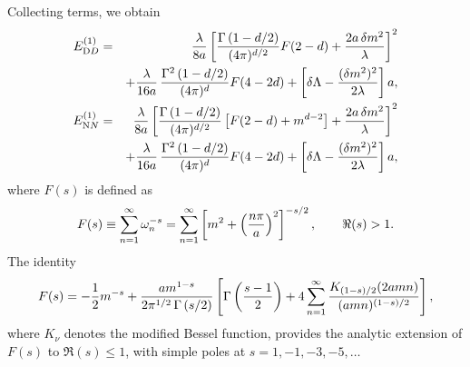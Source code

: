 \documentclass[a4paper,dvips,12pt]{article}
\begin{document}
Collecting terms, we obtain
\begin {eqnarray}
E_{\textrm DD}^{(1)}&=&{\lambda\over 8a}\left[{\Gamma\left(1-d/2\right)\over(4\pi)^{d/2}}
F(2-d)+{2a\,\delta m^{2}\over\lambda}\right]^{2}
\nonumber \\
& &+{\lambda\over 16a}\,{\Gamma^{2}\left(1-d/2\right)\over(4\pi)^{d}}
F(4-2d)+\left[{\delta\Lambda}-{(\delta m^{2})^{2}\over 2\lambda}\right]a,
\label{E2passo}
\\
E_{\textrm NN}^{(1)}&=&{\lambda\over 8a}\left[{\Gamma\left(1-d/2\right)\over(4\pi)^{d/2}}
\left[F(2-d)+m^{d-2}\right]+{2a\,\delta m^{2}\over\lambda}\right]^{2}
\nonumber \\
& &+{\lambda\over 16a}\,{\Gamma^{2}\left(1-d/2\right)\over(4\pi)^{d}}
F(4-2d)+\left[\delta\Lambda-{(\delta m^{2})^{2}\over 2\lambda}\right]a,
\label{E3passo}
\end {eqnarray}
where $F(s)$ is defined as
%
\begin {equation}
F(s)\equiv\sum_{n=1}^{\infty}\omega_{n}^{-s}
=\sum_{n=1}^{\infty}\left[m^{2}+\left({n\pi\over a}\right)^{2}\right]^{-s/2},
\qquad\Re(s)>1.
\end {equation}
The identity \cite{AmbjornWolframAP83}
\begin {equation}
\label{extF}
F(s)=-{1\over 2}m^{-s}
+{am^{1-s}\over 2\pi^{1/2}\,\Gamma\left(s/2\right)}
\left[\Gamma\left({s-1\over 2}\right)+4\sum_{n=1}^{\infty}
{K_{(1-s)/2}(2amn)\over(amn)^{(1-s)/2}}\right],
\end {equation}
where $K_{\nu}$ denotes the modified Bessel function, provides
the analytic extension of $F(s)$ to $\Re(s)\le 1$,
with simple poles at $s=1,-1,-3,-5,\ldots$
\end{document}
